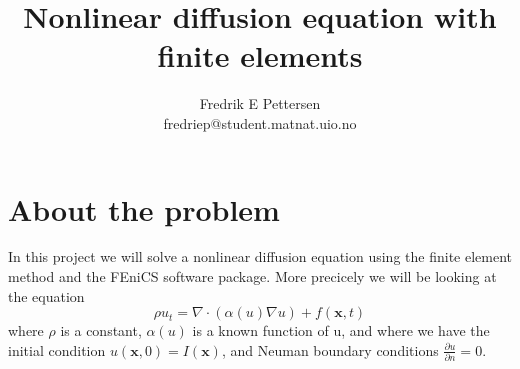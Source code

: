 \documentclass[a4paper,english, 10pt, twoside]{article}
\title{Nonlinear diffusion equation with finite elements}
\author{Fredrik E Pettersen\\ fredriep@student.matnat.uio.no}
\renewcommand{\d}{\partial}
\begin{document}
\maketitle


\section*{About the problem}
In this project we will solve a nonlinear diffusion equation using the finite element method and the FEniCS software package.
More precicely we will be looking at the equation
\begin{equation}\label{eq}
 \rho u_t = \nabla\cdot(\alpha(u)\nabla u) +f(\mathbf{x},t)
\end{equation}
where $\rho$ is a constant, $\alpha(u)$ is a known function of u, and where we have the initial condition $u(\mathbf{x},0) = I(\mathbf{x})$, 
and Neuman boundary conditions $\frac{\d u}{\d n} = 0$.
\end{document}
